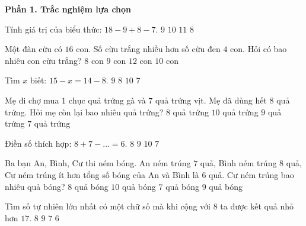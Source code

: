 \textbf{Phần 1. Trắc nghiệm lựa chọn}

\begin{ex} %
Tính giá trị của biểu thức: $18 - 9 + 8 - 7$.
\choice
{$9$}
{\True $10$}
{$11$}
{$8$}
\end{ex}

\begin{ex} %
Một đàn cừu có $16$ con. Số cừu trắng nhiều hơn số cừu đen $4$ con. Hỏi có bao nhiêu con cừu trắng?
\choice
{$8$ con}
{$9$ con}
{$12$ con}
{\True $10$ con}
\end{ex}

\begin{ex} %
Tìm $x$ biết: $15 - x = 14 - 8$.
\choice
{\True $9$}
{$8$}
{$10$}
{$7$}
\end{ex}

\begin{ex} %
Mẹ đi chợ mua $1\text{ chục}$ quả trứng gà và $7$ quả trứng vịt. Mẹ đã dùng hết $8$ quả trứng. Hỏi mẹ còn lại bao nhiêu quả trứng?
\choice
{$8$ quả trứng}
{$10$ quả trứng}
{\True $9$ quả trứng}
{$7$ quả trứng}
\end{ex}

\begin{ex} %
Điền số thích hợp: $8 + 7 - \dots = 6$.
\choice
{$8$}
{\True $9$}
{$10$}
{$7$}
\end{ex}

\begin{ex} %
Ba bạn An, Bình, Cư thi ném bóng. An ném trúng $7$ quả, Bình ném trúng $8$ quả, Cư ném trúng ít hơn tổng số bóng của An và Bình là $6$ quả. Cư ném trúng bao nhiêu quả bóng?
\choice
{$8$ quả bóng}
{$10$ quả bóng}
{$7$ quả bóng}
{\True $9$ quả bóng}
\end{ex}

\begin{ex} %
Tìm số tự nhiên lớn nhất có một chữ số mà khi cộng với $8$ ta được kết quả nhỏ hơn $17$.
\choice
{\True $8$}
{$9$}
{$7$}
{$6$}
\end{ex}

